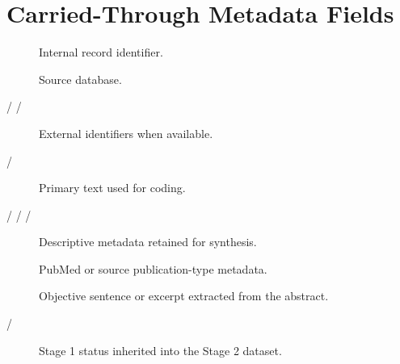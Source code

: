 \documentclass[11pt]{article}
\begin{document}
\section*{Carried-Through Metadata Fields}
\begin{description}
\item[] Internal record identifier.
\item[] Source database.
\item[ /  / ] External identifiers when available.
\item[ / ] Primary text used for coding.
\item[ /  /  / ] Descriptive metadata retained for synthesis.
\item[] PubMed or source publication-type metadata.
\item[] Objective sentence or excerpt extracted from the abstract.
\item[ / ] Stage 1 status inherited into the Stage 2 dataset.
\end{description}
\end{document}
